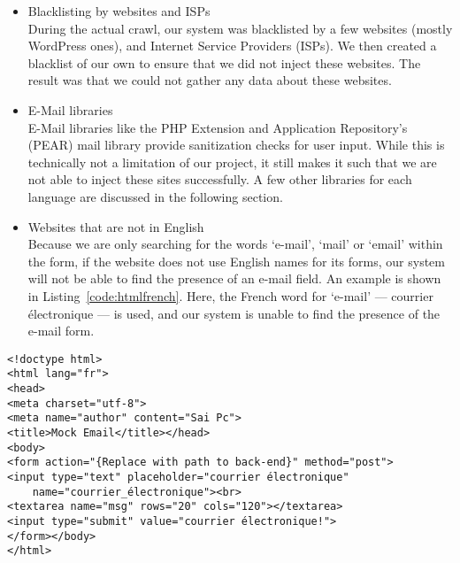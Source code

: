 \begin{itemize}
		\item Blacklisting by websites and ISPs\\
        During the actual crawl, our system was blacklisted by a few websites (mostly WordPress ones), and Internet Service Providers (ISPs). We then created a blacklist of our own to ensure that we did not inject these websites. The result was that we could not gather any data about these websites.
		
		\item E-Mail libraries\\
        E-Mail libraries like the PHP Extension and Application Repository's (PEAR) mail library provide sanitization checks for user input. While this is technically not a limitation of our project, it still makes it such that we are not able to inject these sites successfully.
        A few other libraries for each language are discussed in the following section.
        
        \item Websites that are not in English\\
        Because we are only searching for the words `e-mail', `mail' or `email' within the form, if the website does not use English names for its forms, our system will not be able to find the presence of an e-mail field. An example is shown in Listing~\ref{code:htmlfrench}. Here, the French word for `e-mail' --- courrier \'{e}lectronique --- is used, and our system is unable to find the presence of the e-mail form.
	\end{itemize}
	
\begin{lstlisting}
<!doctype html>
<html lang="fr">
<head>
<meta charset="utf-8">
<meta name="author" content="Sai Pc">
<title>Mock Email</title></head>
<body>
<form action="{Replace with path to back-end}" method="post">
<input type="text" placeholder="courrier électronique" 
	name="courrier_électronique"><br>
<textarea name="msg" rows="20" cols="120"></textarea>
<input type="submit" value="courrier électronique!">
</form></body>
</html>
\end{lstlisting}
